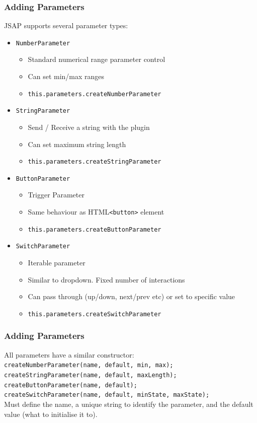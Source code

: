 \documentclass{beamer}
\begin{document}
\begin{frame}
\frametitle{Adding Parameters}
JSAP supports several parameter types:
\begin{itemize}
\item \texttt{NumberParameter}
    \begin{itemize}
    \item Standard numerical range parameter control
    \item Can set min/max ranges
    \item \texttt{this.parameters.createNumberParameter}
    \end{itemize}
\item \texttt{StringParameter}
    \begin{itemize}
    \item Send / Receive a string with the plugin
    \item Can set maximum string length
    \item \texttt{this.parameters.createStringParameter}
    \end{itemize}
\item \texttt{ButtonParameter}
    \begin{itemize}
    \item Trigger Parameter
    \item Same behaviour as HTML\texttt{<button>} element
    \item \texttt{this.parameters.createButtonParameter}
    \end{itemize}
\item \texttt{SwitchParameter}
\begin{itemize}
    \item Iterable parameter
    \item Similar to dropdown. Fixed number of interactions
    \item Can pass through (up/down, next/prev etc) or set to specific value
    \item \texttt{this.parameters.createSwitchParameter}
    \end{itemize}
\end{itemize}
\end{frame}

\begin{frame}
\frametitle{Adding Parameters}
All parameters have a similar constructor:\\
\texttt{createNumberParameter(name, default, min, max);}\\
\texttt{createStringParameter(name, default, maxLength);}\\
\texttt{createButtonParameter(name, default);}\\
\texttt{createSwitchParameter(name, default, minState, maxState);}\\
Must define the name, a unique string to identify the parameter, and the default value (what to initialise it to).

\end{frame}
\end{document}
